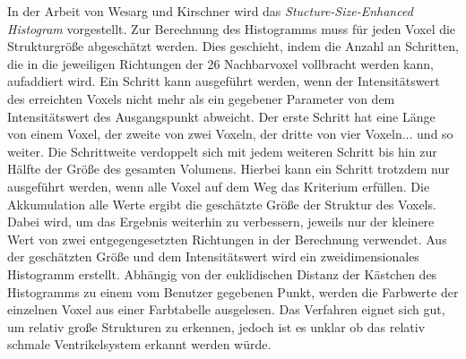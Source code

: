 In der Arbeit von Wesarg und Kirschner \cite{wesarg2009structure, wesarg20102d} wird das \textit{Stucture-Size-Enhanced Histogram} vorgestellt.
\newline
Zur Berechnung des Histogramms  muss für jeden Voxel die Strukturgröße abgeschätzt werden. Dies geschieht, indem die Anzahl an Schritten, die in die jeweiligen Richtungen der 26 Nachbarvoxel vollbracht werden kann, aufaddiert wird. Ein Schritt kann ausgeführt werden, wenn der Intensitätswert des erreichten Voxels nicht mehr als ein gegebener Parameter von dem Intensitätswert des Ausgangspunkt abweicht.
\newline
Der erste Schritt hat eine Länge von einem Voxel, der zweite von zwei Voxeln, der dritte von vier Voxeln... und so weiter. Die Schrittweite verdoppelt sich mit jedem weiteren Schritt bis hin zur Hälfte der Größe des gesamten Volumens. Hierbei kann ein Schritt trotzdem nur ausgeführt werden, wenn alle Voxel auf dem Weg das Kriterium erfüllen. Die Akkumulation alle Werte ergibt die geschätzte Größe der Struktur des Voxels. Dabei wird, um das Ergebnis weiterhin zu verbessern,  jeweils nur der kleinere Wert von zwei entgegengesetzten Richtungen in der Berechnung verwendet. 
\newline
Aus der geschätzten Größe und dem Intensitätswert wird ein zweidimensionales Histogramm erstellt. Abhängig von der euklidischen Distanz der Kästchen des Histogramms zu einem vom Benutzer gegebenen Punkt, werden die Farbwerte der einzelnen Voxel aus einer Farbtabelle ausgelesen.
\newline
Das Verfahren eignet sich gut, um relativ große Strukturen zu erkennen, jedoch ist es unklar ob das relativ schmale Ventrikelsystem erkannt werden würde.



